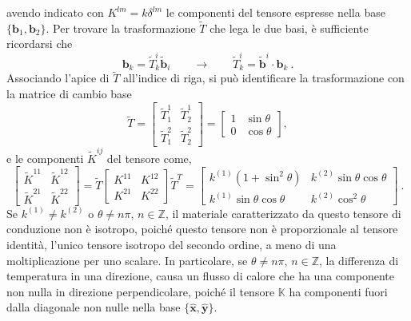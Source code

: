 avendo indicato con $K^{lm} = k \delta^{lm}$ le componenti del tensore espresse nella base $\{ \bm{b}_1, \bm{b}_2 \}$.
Per trovare la trasformazione $\tilde{T}$ che lega le due basi, è sufficiente ricordarsi che
\begin{equation}
    \bm{b}_k = \tilde{T}^i_k \bm{\tilde{b}}_i \qquad \rightarrow \qquad
    \tilde{T}^i_k = \bm{\tilde{b}}^i \cdot \bm{b}_k \ .
\end{equation}
Associando l'apice di $\tilde{T}$ all'indice di riga, si può identificare la trasformazione con la matrice di cambio base
\begin{equation}
 \tilde{T} = 
    \begin{bmatrix}
        \tilde{T}^1_1 & \tilde{T}^1_2 \\
        \tilde{T}^2_1 & \tilde{T}^2_2
    \end{bmatrix} = 
    \begin{bmatrix}
        1 & \sin{\theta} \\ 0 & \cos{\theta}
    \end{bmatrix} ,
\end{equation}
e le componenti $\tilde{K}^{ij}$ del tensore come,
\begin{equation}
  \begin{bmatrix}
    \tilde{K}^{11} & \tilde{K}^{12} \\
    \tilde{K}^{21} & \tilde{K}^{22} 
  \end{bmatrix} =
  \tilde{T} 
  \begin{bmatrix}
    {K}^{11} & {K}^{12} \\
    {K}^{21} & {K}^{22} 
  \end{bmatrix}
  \tilde{T}^T =
  \begin{bmatrix}
      k^{(1)} ( 1 + \sin^2{\theta} ) & k^{(2)} \sin{\theta} \cos{\theta} \\
      k^{(1)} \sin{\theta} \cos{\theta}  & k^{(2)}\cos^2 \theta
  \end{bmatrix} \ .
\end{equation}
Se $k^{(1)} \neq k^{(2)}$ o $\theta \neq n \pi$, $n \in \mathbb{Z}$, il materiale caratterizzato da questo tensore di conduzione non è isotropo, poiché questo tensore non è proporzionale al tensore identità, l'unico tensore isotropo del secondo ordine, a meno di una moltiplicazione per uno scalare. \newline
In particolare, se $\theta \neq n \pi$, $n \in \mathbb{Z}$, la differenza di temperatura in una direzione, causa  un flusso di calore che ha una componente non nulla in direzione perpendicolare, poiché il tensore $\mathbb{K}$ ha componenti fuori dalla diagonale non nulle nella base $\{ \bm{\hat{x}}, \bm{\hat{y}} \}$. \newline
